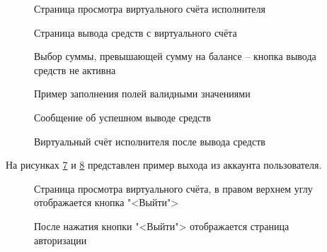 \begin{figure}[ht]
	\caption{Страница просмотра виртуального счёта исполнителя}
	\label{t42:image}
\end{figure}
\clearpage

\begin{figure}[ht]
	\caption{Страница вывода средств с виртуального счёта}
	\label{t43:image}
\end{figure}
\clearpage

\begin{figure}[ht]
	\caption{Выбор суммы, превышающей сумму на балансе -- кнопка вывода средств не активна}
	\label{t44:image}
\end{figure}
\clearpage

\begin{figure}[ht]
	\caption{Пример заполнения полей валидными значениями}
	\label{t45:image}
\end{figure}
\clearpage

\begin{figure}[ht]
	\caption{Сообщение об успешном выводе средств}
	\label{t46:image}
\end{figure}
\clearpage

\begin{figure}[ht]
	\caption{Виртуальный счёт исполнителя после вывода средств}
	\label{t47:image}
\end{figure}

На рисунках \ref{t48:image} и \ref{t49:image} представлен пример выхода из аккаунта пользователя.

\begin{figure}[ht]
	\caption{Страница просмотра виртуального счёта, в правом верхнем углу отображается кнопка "<Выйти">}
	\label{t48:image}
\end{figure}

\begin{figure}[ht]
	\caption{После нажатия кнопки "<Выйти"> отображается страница авторизации}
	\label{t49:image}
\end{figure}

\clearpage